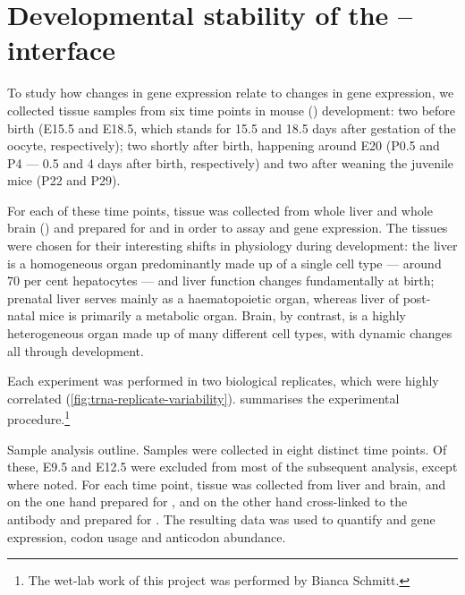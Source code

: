 \chapter{Developmental stability of the -- interface}

To study how changes in \mrna gene expression relate to changes in \trna gene
expression, we collected tissue samples from six time points in mouse (\mmu)
development: two before birth (E15.5 and E18.5, which stands for \num{15.5} and
\num{18.5} days after gestation of the oocyte, respectively); two shortly after
birth, happening around E20 (P0.5 and P4 --- \num{0.5} and \num{4} days after
birth, respectively) and two after weaning the juvenile mice (P22 and P29).

For each of these time points, tissue was collected from whole liver and whole
brain () and prepared for \rnaseq and  \chipseq in order to
assay \mrna and \trna gene expression. The tissues were chosen for their
interesting shifts in physiology during development: the liver is a homogeneous
organ predominantly made up of a single cell type --- around \num{70} per cent
hepatocytes\todo[ref]{} --- and liver function changes fundamentally at birth;
prenatal liver serves mainly as a haematopoietic organ, whereas liver of
post-natal mice is primarily a metabolic organ.\todo[ref]{} Brain, by contrast,
is a highly heterogeneous organ made up of many different cell types, with
dynamic changes all through development.\todo[ref]{}

Each experiment was performed in two biological replicates, which were highly
correlated (\cref{fig:trna-replicate-variability}).
 summarises the experimental
procedure.\footnote{The wet-lab work of this project was performed by Bianca
Schmitt.}

    {Sample analysis outline.}
    {Samples were collected in eight distinct time points. Of these, E9.5 and
    E12.5 were excluded from most of the subsequent analysis, except where
    noted. For each time point, tissue was collected from liver and brain, and
    on the one hand prepared for \rnaseq, and on the other hand cross-linked to
    the  antibody and prepared for \chipseq. The resulting data was used to
    quantify \mrna and \trna gene expression, codon usage and \trna anticodon
    abundance.}

